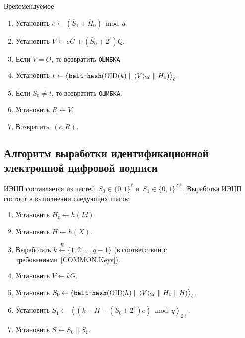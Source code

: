 \begin{appendix}{В}{рекомендуемое}
\begin{enumerate}
\item
Установить $e\leftarrow(\overline{S}_1+\overline{H}_0)\bmod q$.

\item
Установить
$V\leftarrow eG + (\overline{S}_0+2^\ell)Q$.

\item
Если $V=O$, то возвратить \texttt{ОШИБКА}.

\item
Установить $t\leftarrow
\bigl\langle\texttt{belt-hash}
(\text{\normalfont OID}(h)\parallel\langle V\rangle_{2\ell}\parallel H_0)
\bigr\rangle_\ell$.

\item
Если $S_0\neq t$,
то возвратить \texttt{ОШИБКА}.

\item
Установить $R\leftarrow V$.

\item
Возвратить~$(e,R)$.
\end{enumerate}

\subsection{Алгоритм выработки идентификационной 
электронной цифровой подписи}\label{IBS.Sign}

ИЭЦП составляется из 
частей~$S_0\in\{0,1\}^\ell$ и~$S_1\in\{0,1\}^{2\ell}$. 
Выработка ИЭЦП состоит в выполнении следующих шагов:
\begin{enumerate}
\item
Установить $H_0\leftarrow h(Id)$.

\item
Установить $H\leftarrow h(X)$.

\item
Выработать
$k\stackrel{R}{\leftarrow}\{1,2,\ldots,q-1\}$
(в соответствии с требованиями~\ref{COMMON.Keys}).

\item
Установить $V\leftarrow kG$.

\item
Установить
$S_0\leftarrow
\bigl\langle\texttt{belt-hash}
(\text{\normalfont OID}(h)\parallel\langle V\rangle_{2\ell}\parallel H_0\parallel H)
\bigr\rangle_\ell$.

\item
Установить
$S_1\leftarrow\left\langle(k-\overline{H}-(\overline{S}_0+2^\ell)e)\bmod q
\right\rangle_{2\ell}$.

\item
Установить $S\leftarrow S_0\parallel S_1$.


\end{enumerate}
\end{appendix}
